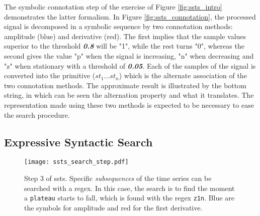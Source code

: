 The symbolic connotation step of the exercise of Figure \ref{fig:ssts_intro} demonstrates the latter formalism. In Figure \ref{fig:ssts_connotation}, the processed signal is decomposed in a symbolic sequence by two connotation methods: amplitude (blue) and derivative (red). The first implies that the sample values superior to the threshold \textit{\textbf{0.8}} will be "1", while the rest turns "0", whereas the second gives the value "p" when the signal is increasing, "n" when decreasing and "z" when stationary with a threshold of \textit{\textbf{0.05}}. Each of the samples of the signal is converted into the primitive ($st_1...st_n$) which is the alternate association of the two connotation methods. The approximate result is illustrated by the bottom string, in which can be seen the alternation property and what it translates. The representation made using these two methods is expected to be necessary to ease the search procedure.

\subsection{Expressive Syntactic Search}

\begin{figure}
\centering
\texttt{[image: ssts\_search\_step.pdf]}
\caption{Step 3 of \gls{ssts}. Specific \textit{subsequences} of the time series can be searched with a \gls{regex}. In this case, the search is to find the moment a \texttt{plateau} starts to fall, which is found with the \gls{regex} \texttt{z1n}. Blue are the symbols for amplitude and red for the first derivative.}
\label{fig:ssts_search}
\end{figure}

